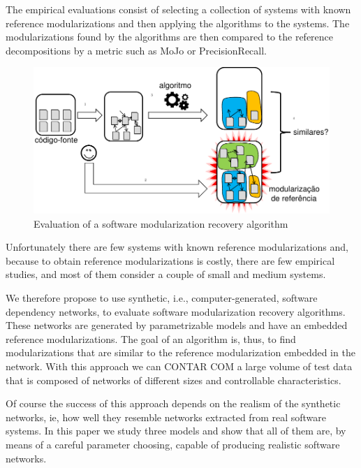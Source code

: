 The empirical evaluations consist of selecting a collection of systems with
known reference modularizations and then applying the algorithms to the systems.
The modularizations found by the algorithms are then compared to the reference
decompositions by a metric such as MoJo \cite{Tzerpos1999} or PrecisionRecall.

  \begin{figure}[!t]
  \centering
  \includegraphics[width=1.0\textwidth]{diagram}
  \caption{Evaluation of a software modularization recovery algorithm}
  \label{fig:diagram}
  \end{figure}


Unfortunately there are few systems with known reference modularizations and,
because to obtain reference modularizations is costly, there are few empirical
studies, and most of them consider a couple of small and medium systems.

We therefore propose to use synthetic, i.e., computer-generated, software
dependency networks, to evaluate software modularization recovery algorithms.
These networks are generated by parametrizable models and have an embedded
reference modularizations. The goal of an algorithm is, thus, to find
modularizations that are similar to the reference modularization embedded in the
network. With this approach we can CONTAR COM a large volume of test data that
is composed of networks of different sizes and controllable characteristics.

Of course the success of this approach depends on the realism of the synthetic
networks, ie, how well they resemble networks extracted from real software
systems. In this paper we study three models and show that all of them are, by
means of a careful parameter choosing, capable of producing realistic software
networks.

